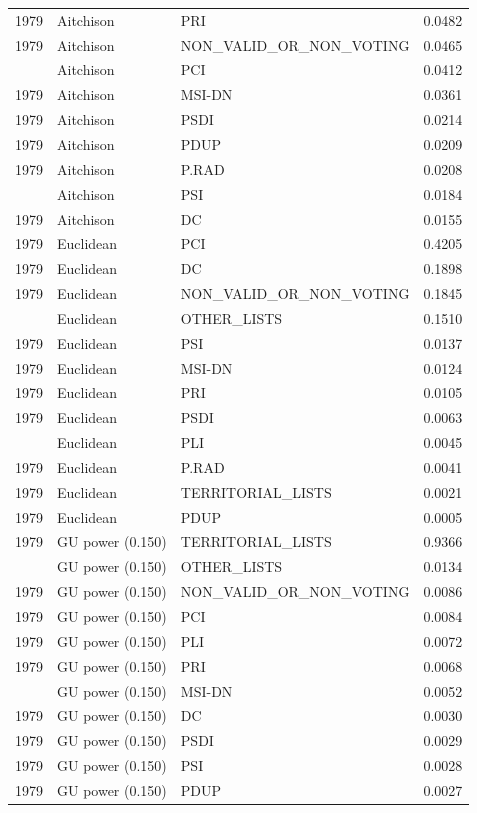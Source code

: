 \begin{longtable}[t]{rllr}
1979 & Aitchison & PRI & 0.0482\\
1979 & Aitchison & NON\_VALID\_OR\_NON\_VOTING & 0.0465\\
\addlinespace
1979 & Aitchison & PCI & 0.0412\\
1979 & Aitchison & MSI-DN & 0.0361\\
1979 & Aitchison & PSDI & 0.0214\\
1979 & Aitchison & PDUP & 0.0209\\
1979 & Aitchison & P.RAD & 0.0208\\
\addlinespace
1979 & Aitchison & PSI & 0.0184\\
1979 & Aitchison & DC & 0.0155\\
1979 & Euclidean & PCI & 0.4205\\
1979 & Euclidean & DC & 0.1898\\
1979 & Euclidean & NON\_VALID\_OR\_NON\_VOTING & 0.1845\\
\addlinespace
1979 & Euclidean & OTHER\_LISTS & 0.1510\\
1979 & Euclidean & PSI & 0.0137\\
1979 & Euclidean & MSI-DN & 0.0124\\
1979 & Euclidean & PRI & 0.0105\\
1979 & Euclidean & PSDI & 0.0063\\
\addlinespace
1979 & Euclidean & PLI & 0.0045\\
1979 & Euclidean & P.RAD & 0.0041\\
1979 & Euclidean & TERRITORIAL\_LISTS & 0.0021\\
1979 & Euclidean & PDUP & 0.0005\\
1979 & GU power (0.150) & TERRITORIAL\_LISTS & 0.9366\\
\addlinespace
1979 & GU power (0.150) & OTHER\_LISTS & 0.0134\\
1979 & GU power (0.150) & NON\_VALID\_OR\_NON\_VOTING & 0.0086\\
1979 & GU power (0.150) & PCI & 0.0084\\
1979 & GU power (0.150) & PLI & 0.0072\\
1979 & GU power (0.150) & PRI & 0.0068\\
\addlinespace
1979 & GU power (0.150) & MSI-DN & 0.0052\\
1979 & GU power (0.150) & DC & 0.0030\\
1979 & GU power (0.150) & PSDI & 0.0029\\
1979 & GU power (0.150) & PSI & 0.0028\\
1979 & GU power (0.150) & PDUP & 0.0027\\

\end{longtable}
